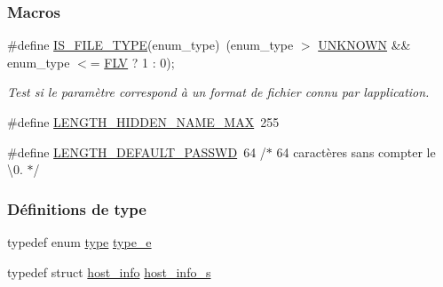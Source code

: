 \subsubsection*{Macros}
\begin{DoxyCompactItemize}
\item 
\#define \hyperlink{a00047_a8b3aa3f669b97d484ddaf145ca9380ef}{I\+S\+\_\+\+F\+I\+L\+E\+\_\+\+T\+Y\+PE}(enum\+\_\+type)~(enum\+\_\+type $>$ \hyperlink{a00047_a7aead736a07eaf25623ad7bfa1f0ee2da6ce26a62afab55d7606ad4e92428b30c}{U\+N\+K\+N\+O\+WN} \&\& enum\+\_\+type $<$= \hyperlink{a00047_a7aead736a07eaf25623ad7bfa1f0ee2da3648fb67ff3ff0f5baefbff1eb09b651}{F\+LV} ? 1 \+: 0);
\begin{DoxyCompactList}\small\item\em Test si le paramètre correspond à un format de fichier connu par l\textquotesingle{}application. \end{DoxyCompactList}\item 
\#define \hyperlink{a00047_a7abae389b15b6d71177b6ec6155aad8f}{L\+E\+N\+G\+T\+H\+\_\+\+H\+I\+D\+D\+E\+N\+\_\+\+N\+A\+M\+E\+\_\+\+M\+AX}~255
\item 
\#define \hyperlink{a00047_a24c0fa06fa7cc4e918a9d217b1e62657}{L\+E\+N\+G\+T\+H\+\_\+\+D\+E\+F\+A\+U\+L\+T\+\_\+\+P\+A\+S\+S\+WD}~64       /$\ast$ 64 caractères sans compter le \textquotesingle{}\textbackslash{}0\textquotesingle{}. $\ast$/
\end{DoxyCompactItemize}
\subsubsection*{Définitions de type}
\begin{DoxyCompactItemize}
\item 
typedef enum \hyperlink{a00047_a7aead736a07eaf25623ad7bfa1f0ee2d}{type} \hyperlink{a00047_af1ca434cca36ba9fb2a45f6cef3a16d6}{type\+\_\+e}
\item 
typedef struct \hyperlink{a00146}{host\+\_\+info} \hyperlink{a00047_a47a6ba857e6823e361bd050dfdf415a2}{host\+\_\+info\+\_\+s}
\end{DoxyCompactItemize}

